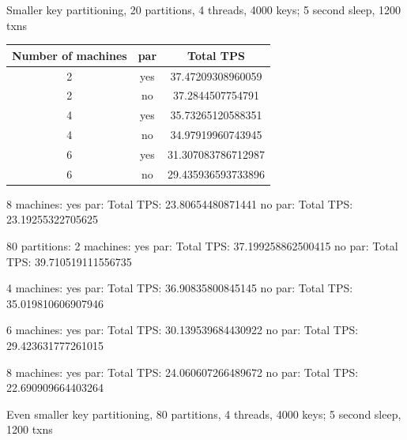 \documentclass[a4paper, 10pt, notitlepage]{article}
\begin{document}

Smaller key partitioning, 20 partitions, 4 threads, 4000 keys; 5 second sleep, 1200 txns

\begin{tabular}{c c c}
Number of machines & par & Total TPS \\
\hline
2 & yes & 37.47209308960059\\
2 & no & 37.2844507754791\\
4 & yes & 35.73265120588351\\
4 & no & 34.97919960743945\\
6 & yes & 31.307083786712987\\
6 & no & 29.435936593733896\\
\end{tabular}

8 machines:
yes par: Total TPS: 23.80654480871441
no par: Total TPS: 23.19255322705625

80 partitions:
2 machines:
yes par: Total TPS: 37.199258862500415
no par: Total TPS: 39.710519111556735 

4 machines:
yes par: Total TPS: 36.90835800845145
no par: Total TPS: 35.019810606907946

6 machines:
yes par: Total TPS: 30.139539684430922
no par: Total TPS: 29.423631777261015

8 machines:
yes par: Total TPS: 24.060607266489672
no par: Total TPS: 22.690909664403264

Even smaller key partitioning, 80 partitions, 4 threads, 4000 keys; 5 second sleep, 1200 txns
\end{document}
